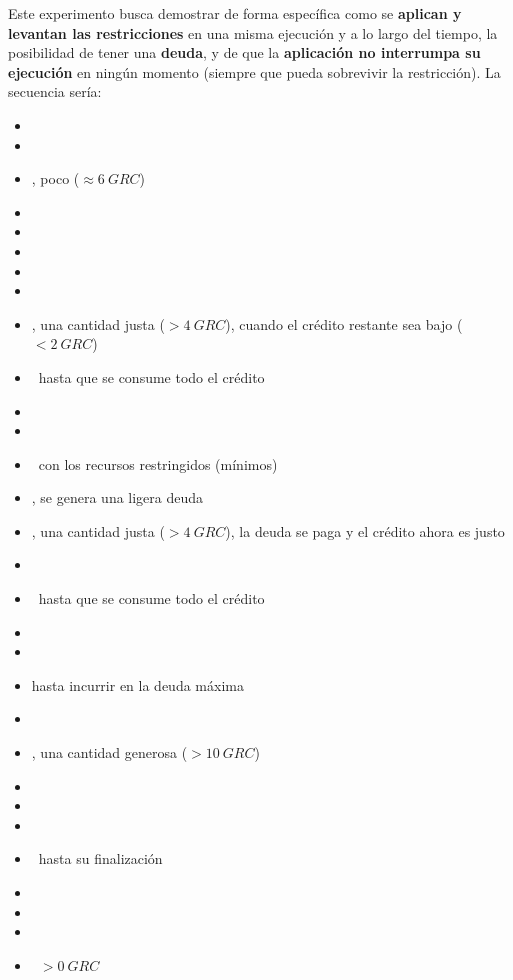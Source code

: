 \documentclass[preprint,3p]{elsarticle}
\begin{document}
\noindent 
Este experimento busca demostrar de forma específica como se \textbf{aplican y levantan las restricciones} en una misma ejecución y a lo largo del tiempo, la posibilidad de tener una \textbf{deuda}, y de que la \textbf{aplicación no interrumpa su ejecución} en ningún momento (siempre que pueda sobrevivir la restricción). La secuencia sería:
\begin{itemize}
	\setlength\itemsep{0em}
	\setlength{\itemindent}{-2mm}
	\item \UserSendsAllTasks
	\item \UserNoCredit
	\item \UserSendsCredit, poco ($\approx 6~GRC$)
	\item \ContainerUp
	\item \AppStart
	\item \ServerlessAdapts
	\item \AccountingConsumes
	\item \AppRuns
	\item \UserSendsCredit, una cantidad justa ($ > 4~GRC$), cuando el crédito restante sea bajo ($ < 2~GRC$)
	\item \AppRuns~hasta que se consume todo el crédito 
	\item \CreditDepleted
	\item \AccountingRestricts
	\item \AppRuns~con los recursos restringidos (mínimos)
	\item \AccountingConsumes, se genera una ligera deuda
	\item \UserSendsCredit, una cantidad justa ($ > 4~GRC$), la deuda se paga y el crédito ahora es justo
	\item \AccountingAllows
	\item \AppRuns~hasta que se consume todo el crédito 
	\item \CreditDepleted
	\item \AccountingRestricts
	\item \AppRuns hasta incurrir en la deuda máxima
	\item \ContainerKilled
	\item \UserSendsCredit, una cantidad generosa ($ > 10~GRC$)
	\item \ContainerUp
	\item \AccountingAllows
	\item \ServerlessAdapts
	\item \AppRuns~hasta su finalización
	\item \ServerlessDown
	\item \AccountingIdle
	\item \ContainerTimeout
	\item \AccountingCredit~$ > 0~GRC$
\end{itemize}
\end{document}
